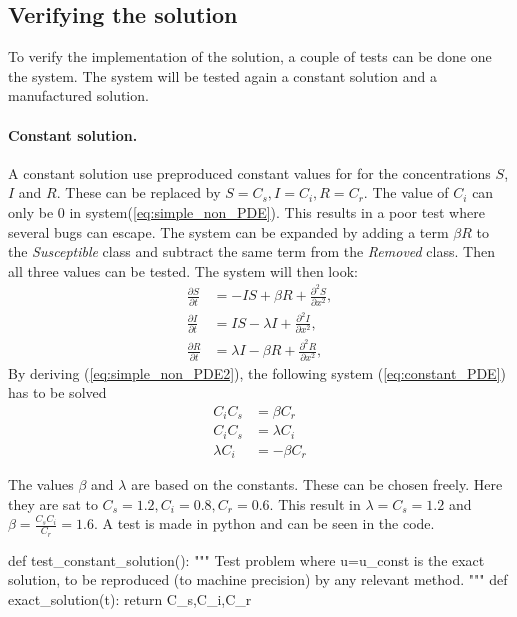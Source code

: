 \documentclass[%
twoside,                 %
final,                   %
10pt]{article}
\begin{document}
\subsection{Verifying the solution}
To verify the implementation of the solution, a couple of tests can be done one the system. The system will be tested again a constant solution and a manufactured solution.   

\paragraph{Constant solution.}
A constant solution use preproduced constant values for for the concentrations $S$, $I$ and $R$. These can be replaced by $S = C_s,I=C_i,R=C_r$. The value of $C_i$ can only be 0 in system(\ref{eq:simple_non_PDE}). This results in a poor test where several bugs can escape. The system can be expanded by adding a term $\beta R$ to the \emph{Susceptible} class and subtract the same term from the \emph{Removed} class. Then all three values can be tested. The system will then look: 
\begin{equation} \label{eq:simple_non_PDE2}
	\begin{aligned}
	\frac{\partial S}{\partial t} &= -IS + \beta R + \frac{\partial^2 S}{\partial x^2},\\
	\frac{\partial I}{\partial t} &= IS- \lambda I + \frac{\partial^2 I}{\partial x^2},\\
	\frac{\partial R}{\partial t} &= \lambda I - \beta R + \frac{\partial^2 R}{\partial x^2},
	\end{aligned}
\end{equation}
By deriving (\ref{eq:simple_non_PDE2}), the following system (\ref{eq:constant_PDE}) has to be solved
\begin{equation} \label{eq:constant_PDE}
	\begin{aligned}
	C_iC_s &= \beta C_r \\
	C_iC_s &= \lambda C_i \\
	\lambda C_i &= -\beta C_r 
	\end{aligned}
\end{equation}

The values $\beta$ and $\lambda$ are based on the constants. These can be chosen freely. Here they are sat to $C_s = 1.2,C_i=0.8,C_r=0.6$. This result in $\lambda= C_s = 1.2$ and $\beta= \frac{C_s C_i}{C_r}=1.6$. A test is made in python and can be seen in the code.

\bpycod
def test_constant_solution():
    """
    Test problem where u=u_const is the exact solution, to be
    reproduced (to machine precision) by any relevant method.
    """
    def exact_solution(t):
        return C_s,C_i,C_r
    
\end{document}
